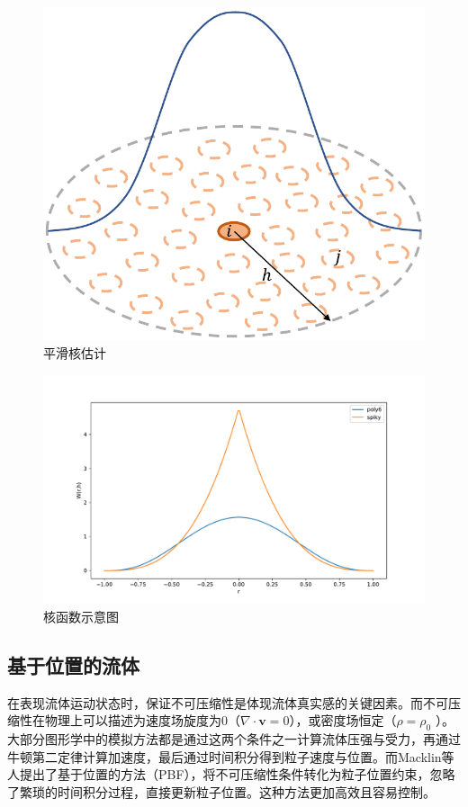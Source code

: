     \begin{figure}
    	\centering
    	\includegraphics[width=.45\textwidth]{figures/simulation/kernel.pdf}
    	\caption{平滑核估计}
    	\label{fig:kernelfunc}
    \end{figure}
    
    \begin{figure}
    	\centering
    	\includegraphics[width=.85\textwidth]{figures/simulation/kernel_func.pdf}
    	\caption{核函数示意图}
    \end{figure}

\subsection{基于位置的流体}
    在表现流体运动状态时，保证不可压缩性是体现流体真实感的关键因素。而不可压缩性在物理上可以描述为速度场旋度为0（$\nabla \cdot \mathbf v = 0$），或密度场恒定（$\rho = \rho_0$ ）。大部分图形学中的模拟方法都是通过这两个条件之一计算流体压强与受力，再通过牛顿第二定律计算加速度，最后通过时间积分得到粒子速度与位置。而Macklin等人\cite{MM13PBF}提出了基于位置的方法（PBF），将不可压缩性条件转化为粒子位置约束，忽略了繁琐的时间积分过程，直接更新粒子位置。这种方法更加高效且容易控制。

